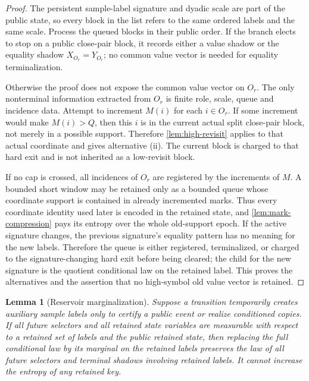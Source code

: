 \documentclass[11pt]{article}
\newcommand{\Cref}[1]{\ref{#1}}
\newtheorem{lemma}[theorem]{Lemma}
\theoremstyle{remark}
\begin{document}
\begin{proof}
The persistent sample-label signature and dyadic scale are part of the public state, so every block in the list refers to the same ordered labels and the same scale.  Process the queued blocks in their public order.  If the branch elects to stop on a public close-pair block, it records either a value shadow or the equality shadow $X_{O_r}=Y_{O_r}$; no common value vector is needed for equality terminalization.

Otherwise the proof does not expose the common value vector on $O_r$.  The only nonterminal information extracted from $O_r$ is finite role, scale, queue and incidence data.  Attempt to increment $M(i)$ for each $i\in O_r$.  If some increment would make $M(i)>Q$, then this $i$ is in the current actual split close-pair block, not merely in a possible support.  Therefore \Cref{lem:high-revisit} applies to that actual coordinate and gives alternative (ii).  The current block is charged to that hard exit and is not inherited as a low-revisit block.

If no cap is crossed, all incidences of $O_r$ are registered by the increments of $M$.  A bounded short window may be retained only as a bounded queue whose coordinate support is contained in already incremented marks.  Thus every coordinate identity used later is encoded in the retained state, and \Cref{lem:mark-compression} pays its entropy over the whole old-support epoch.  If the active signature changes, the previous signature's equality pattern has no meaning for the new labels.  Therefore the queue is either registered, terminalized, or charged to the signature-changing hard exit before being cleared; the child for the new signature is the quotient conditional law on the retained label.  This proves the alternatives and the assertion that no high-symbol old value vector is retained.
\end{proof}


\begin{lemma}[Reservoir marginalization]\label{lem:reservoir-marg}
Suppose a transition temporarily creates auxiliary sample labels only to certify a public event or realize conditioned copies.  If all future selectors and all retained state variables are measurable with respect to a retained set of labels and the public retained state, then replacing the full conditional law by its marginal on the retained labels preserves the law of all future selectors and terminal shadows involving retained labels.  It cannot increase the entropy of any retained key.
\end{lemma}
\end{document}
